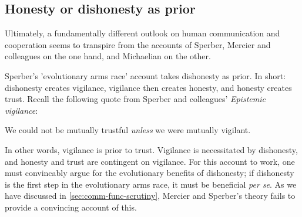 
\subsection{Honesty or dishonesty as prior}
\label{sec:honesty-dishonesty}

Ultimately, a fundamentally different outlook on human communication and cooperation seems to transpire from the accounts of Sperber, Mercier and colleagues on the one hand, and Michaelian on the other.

Sperber's 'evolutionary arms race' account takes dishonesty as prior.
In short: dishonesty creates vigilance, vigilance then creates honesty, and honesty creates trust. Recall the following quote from Sperber and colleagues' \emph{Epistemic vigilance}:
\begin{quoting}
    We could not be mutually trustful \emph{unless} we were mutually vigilant.
\end{quoting}
In other words, vigilance is prior to trust. Vigilance is necessitated by dishonesty, and honesty and trust are contingent on vigilance.
For this account to work, one must convincably argue for the evolutionary benefits of dishonesty; if dishonesty is the first step in the evolutionary arms race, it must be beneficial \emph{per se}. As we have discussed in \cref{sec:comm-func-scrutiny}, Mercier and Sperber's theory fails to provide a convincing account of this.


